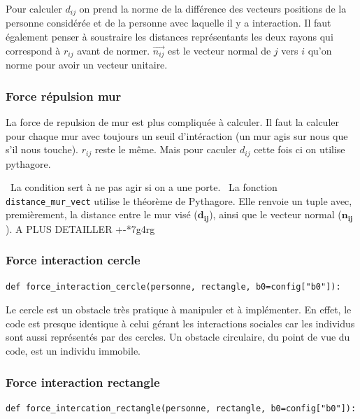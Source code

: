 \documentclass[a4paper,12pt]{article}
\begin{document}
Pour calculer $d_{ij}$ on prend la norme de la différence des vecteurs positions de la personne considérée et de la personne avec laquelle il y a interaction. Il faut également penser à soustraire les distances représentants les deux rayons qui correspond à $r_{ij}$ avant de normer. $\vec{n_{ij}}$ est le vecteur normal de $j$ vers $i$ qu'on norme pour avoir un vecteur unitaire. 


\subsubsection{Force répulsion mur}
La force de repulsion de mur est plus compliquée à calculer. Il faut la calculer pour chaque mur avec toujours un seuil d'intéraction (un mur agis sur nous que s'il nous touche). \textbf{$r_{ij}$} reste le même. Mais pour caculer \textbf{$d_{ij}$} cette fois ci on utilise pythagore.

\
La condition sert à ne pas agir si on a une porte.
\
La fonction \texttt{distance\_mur\_vect} utilise le théorème de Pythagore. Elle renvoie un tuple avec, premièrement, la distance entre le mur visé ($\mathbf{d_{ij}}$), ainsi que le vecteur normal ($\mathbf{n_{ij}}$). A PLUS DETAILLER +-*7g4rg

\subsubsection{Force interaction cercle}
\begin{verbatim}
def force_interaction_cercle(personne, rectangle, b0=config["b0"]):
\end{verbatim}

Le cercle est un obstacle très pratique à manipuler et à implémenter. En effet, le code est presque identique à celui gérant les interactions sociales car les individus sont aussi représentés par des cercles. Un obstacle circulaire, du point de vue du code, est un individu immobile.

\subsubsection{Force interaction rectangle}

\begin{verbatim}
def force_intercation_rectangle(personne, rectangle, b0=config["b0"]):
\end{verbatim}
\end{document}
